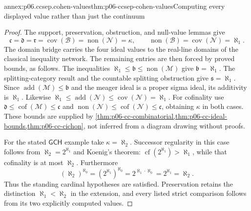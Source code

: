 \begin{annexitem}{annex:p06.ccsep.cohen-values}{thm:p06-ccsep-cohen-values}{Computing every displayed value rather than just the continuum}
\begin{proof}
The support, preservation, obstruction, and null-value lemmas give
\[
 \mathfrak c=\mathfrak d=\mathfrak r
 =\operatorname{cov}(\mathcal B)
 =\operatorname{non}(\mathcal N)=\kappa,
 \qquad
 \operatorname{non}(\mathcal B)
 =\operatorname{cov}(\mathcal N)=\aleph_1.
\]
The domain bridge carries the four ideal values to the real-line
domains of the classical inequality network. The remaining entries
are then forced by proved bounds, as follows. The inequalities
\(\aleph_1\leq\mathfrak b\leq\operatorname{non}(\mathcal M)\)
give \(\mathfrak b=\aleph_1\). The splitting-category result and
the countable splitting obstruction give \(\mathfrak s=\aleph_1\).
Since \(\operatorname{add}(\mathcal M)\leq\mathfrak b\) and
the meager ideal is a proper sigma ideal, its additivity is
\(\aleph_1\). Likewise
\(\aleph_1\leq\operatorname{add}(\mathcal N)
\leq\operatorname{cov}(\mathcal N)=\aleph_1\).
For cofinality use
\(\mathfrak d\leq\operatorname{cof}(\mathcal M)\leq\mathfrak c\)
and
\(\operatorname{non}(\mathcal N)\leq\operatorname{cof}(\mathcal N)
\leq\mathfrak c\), obtaining \(\kappa\) in both cases.
These bounds are supplied by
\cref{thm:p06-cc-combinatorial,thm:p06-cc-ideal-bounds,thm:p06-cc-cichon},
not inferred from a diagram drawing without proofs.

For the stated \(\mathsf{GCH}\) example take
\(\kappa=\aleph_2\). Successor regularity in this case follows
from \(\aleph_2=2^{\aleph_1}\) and Koenig's theorem:
\(\operatorname{cf}(2^{\aleph_1})>\aleph_1\), while that
cofinality is at most \(\aleph_2\). Furthermore
\[
 (\aleph_2)^{\aleph_0}
  =(2^{\aleph_1})^{\aleph_0}
  =2^{\aleph_1\cdot\aleph_0}
  =2^{\aleph_1}=\aleph_2.
\]
Thus the standing cardinal hypotheses are satisfied. Preservation
retains the distinction \(\aleph_1<\aleph_2\) in the extension,
and every listed strict comparison follows from its two explicitly
computed values.
\end{proof}
\end{annexitem}
